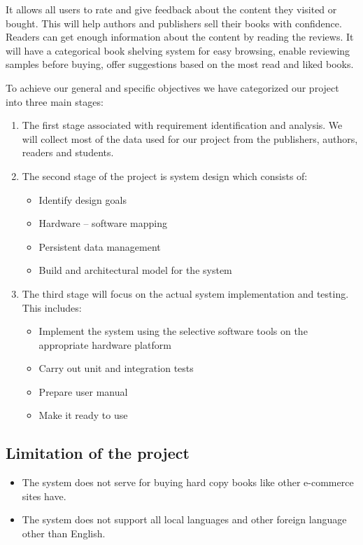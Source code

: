 It allows all users to rate and give feedback about the content they visited or bought. This will help authors and publishers sell their books with confidence. Readers can get enough information about the content by reading the reviews. It will have a categorical book shelving system for easy browsing, enable reviewing samples before buying, offer suggestions based on the most read and liked books.

To achieve our general and specific objectives we have categorized our project into three main stages:

\begin{enumerate}
	\item The first stage associated with requirement identification and analysis. We will collect most of the data used for our project from the publishers, authors, readers and students.
	
	\item The second stage of the project is system design which consists of:	
	\begin{itemize}
		\item Identify design goals
		\item Hardware – software mapping
		\item Persistent data management
		\item Build and architectural model for the system
	\end{itemize}

	\item The third stage will focus on the actual system implementation and testing. This includes:
	\begin{itemize}
		\item Implement the system using the selective software tools on the appropriate hardware platform
		\item Carry out unit and integration tests
		\item Prepare user manual
		\item Make it ready to use
	\end{itemize}
\end{enumerate}

	\subsection{Limitation of the project}

\begin{itemize}
\item The system does not serve for buying hard copy books like other e-commerce sites have.
\item The system does not support all local languages and other foreign language other than English.
\end{itemize}

